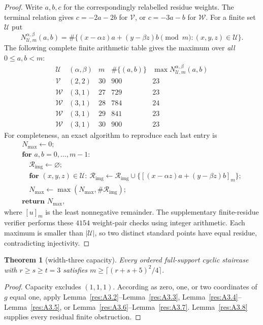 \documentclass[11pt]{article}
\newtheorem{theorem}{Theorem}[section]
\theoremstyle{definition}
\theoremstyle{remark}
\theoremstyle{plain}
\begin{document}
\begin{proof}
Write $a,b,c$ for the correspondingly relabelled residue weights.
The terminal relation gives $c=-2a-2b$ for $\mathcal V$, or $c=-3a-b$ for $\mathcal W$.
For a finite set $\mathcal U$ put
\[
 N_{\mathcal U,m}^{\alpha,\beta}(a,b)
 =\#\{(x-\alpha z)a+(y-\beta z)b\pmod m:(x,y,z)\in \mathcal U\}.
\]
The following complete finite arithmetic table gives the maximum over
\emph{all} $0\le a,b<m$:
\[
\begin{array}{c|c|c|c|c}
 \mathcal U&(\alpha,\beta)&m&\#\{(a,b)\}&\max N_{\mathcal U,m}^{\alpha,\beta}(a,b)\\\hline
 \mathcal V&(2,2)&30&900&23\\
 \mathcal W&(3,1)&27&729&23\\
 \mathcal W&(3,1)&28&784&24\\
 \mathcal W&(3,1)&29&841&23\\
 \mathcal W&(3,1)&30&900&23
\end{array}
\]
For completeness, an exact algorithm to reproduce each last entry is
\[
\begin{array}{l}
 N_{\max}\gets0;\\
 \textbf{for }a,b=0,\ldots,m-1:\\
 \quad \mathcal R_{\mathrm{img}}\gets\varnothing;\\
 \quad\textbf{for }(x,y,z)\in \mathcal U:\
       \mathcal R_{\mathrm{img}}\gets \mathcal R_{\mathrm{img}}\cup\{[(x-\alpha z)a+(y-\beta z)b]_m\};\\
 \quad N_{\max}\gets\max(N_{\max},\#\mathcal R_{\mathrm{img}});\\
 \textbf{return }N_{\max},
\end{array}
\]
where $[u]_m$ is the least nonnegative remainder.  The supplementary finite-residue verifier performs these $4154$
weight-pair checks using integer arithmetic.  Each maximum is smaller than $|\mathcal U|$, so two
distinct standard points have equal residue, contradicting injectivity.
\end{proof}


\begin{theorem}[width-three capacity]\label{res:A3.9}
Every ordered full-support cyclic staircase with $r\ge s\ge t=3$ satisfies
$m\ge\lceil(r+s+5)^2/4\rceil$.
\end{theorem}
\begin{proof}
Capacity excludes $(1,1,1)$.  According as zero, one, or two coordinates
of $g$ equal one, apply Lemma~\ref{res:A3.2}--Lemma~\ref{res:A3.3}, Lemma~\ref{res:A3.4}--Lemma~\ref{res:A3.5}, or Lemma~\ref{res:A3.6}--Lemma~\ref{res:A3.7}.
Lemma~\ref{res:A3.8} supplies every residual finite obstruction. \end{proof}
\end{document}
